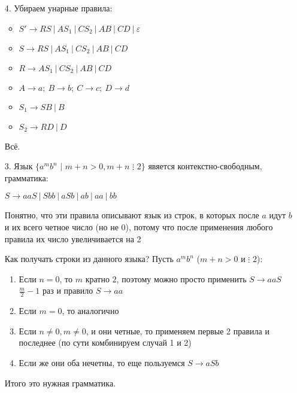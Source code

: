 \documentclass[12pt]{article}
\begin{document}
\begin{enumerate}
	\item [4.] Убираем унарные правила:
		\begin{itemize}
			\item $S' \to R S \ | \ A S_1 \ | \ C S_2 \ | \ A B \ | \ C D \ | \ \varepsilon$
			\item $S \to R S \ | \ A S_1 \ | \ C S_2 \ | \ A B \ | \ C D$
			\item $R \to A S_1 \ | \ C S_2 \ | \ A B \ | \ C D$
			\item $A \to a; \ B \to b; \ C \to c; \ D \to d$
			\item $S_1 \to S B \ | \ B$
			\item $S_2 \to R D \ | \ D$
		\end{itemize}
	Всё.
 
 \item[3.] Язык $\{ a^m b^n\,\,|\,\,m + n > 0, m + n\,\,\vdots\,\, 2 \}$ явяется контекстно-свободным, грамматика:

	$S \to a a S\ |\ S b b\ |\ a S b\ |\ a b\ |\ a a\ |\ b b$

	Понятно, что эти правила описывают язык из строк, в которых после $a$ идут $b$ и их всего четное число (но не 0), потому что после применения любого правила их число увеличивается на 2

	Как получать строки из данного языка? Пусть $a^mb^n$ ($m+n > 0$ и $\vdots \,\, 2$):

	\begin{enumerate}
		\item Если $n=0$, то $m$ кратно $2$, поэтому можно просто применить 
		$S \to a a S$ $\frac{m}{2} - 1$ раз и правило $S \to a a$
		\item Если $m=0$, то аналогично
		\item Если $n \neq 0, m \neq 0$, и они четные, то применяем первые 2 правила и последнее (по сути комбинируем случай 1 и 2)
		\item Если же они оба нечетны, то еще пользуемся $S \to a S b$
	\end{enumerate}

	Итого это нужная грамматика.

    \end{enumerate}
\end{document}
